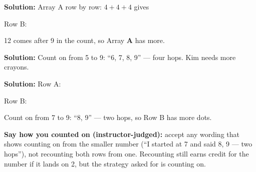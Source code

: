 \documentclass[12pt]{article}
\begin{document}
\textbf{Solution:} Array A row by row: $4 + 4 + 4$ gives 

Row B: 

12 comes after 9 in the count, so Array \textbf{A} has more. 


\textbf{Solution:} Count on from 5 to 9: ``6, 7, 8, 9'' --- four hops. Kim
needs  more crayons.


\textbf{Solution:} Row A: 

Row B: 

Count on from 7 to 9: ``8, 9'' --- two hops, so Row B has  more dots.

\textbf{Say how you counted on (instructor-judged):} accept any wording that
shows counting on from the smaller number (``I started at 7 and said 8, 9 ---
two hops''), not recounting both rows from one. Recounting still earns credit
for the number if it lands on 2, but the strategy asked for is counting on.
\end{document}
